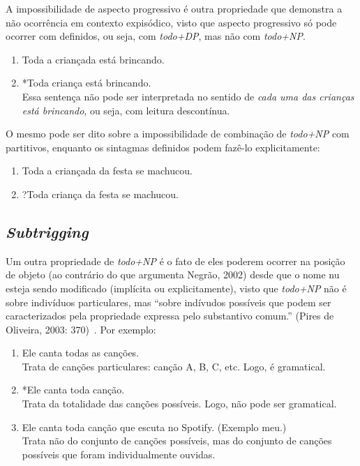A impossibilidade de aspecto progressivo é outra propriedade que demonstra a não ocorrência em contexto expisódico, visto que aspecto progressivo só pode ocorrer com definidos, ou seja, com \emph{todo+DP}, mas não com \emph{todo+NP}.

\begin{enumerate}[resume]
    \item Toda a criançada está brincando.
    \item *Toda criança está brincando. \\
    Essa sentença não pode ser interpretada no sentido de \emph{cada uma das crianças está brincando}, ou seja, com leitura descontínua.
\end{enumerate}

O mesmo pode ser dito sobre a impossibilidade de combinação de \emph{todo+NP} com partitivos, enquanto os sintagmas definidos podem fazê-lo explicitamente:

\begin{enumerate}[resume]
    \item Toda a criançada da festa se machucou.
    \item ?Toda criança da festa se machucou.
\end{enumerate}

\subsection{\emph{Subtrigging}}
Um outra propriedade de \emph{todo+NP} é o fato de eles poderem ocorrer na posição de objeto (ao contrário do que argumenta Negrão, 2002) desde que o nome nu esteja sendo modificado (implícita ou explicitamente), visto que \emph{todo+NP} não é sobre indivíduos particulares, mas ``sobre indívudos possíveis que podem ser caracterizados pela propriedade expressa pelo substantivo comum.'' (Pires de Oliveira, 2003: 370)~\cite{PiresOliv2003}. Por exemplo:

\begin{enumerate}[resume]
    \item Ele canta todas as canções. \\
    Trata de canções particulares: canção A, B, C, etc. Logo, é gramatical.
    \item *Ele canta toda canção. \\
    Trata da totalidade das canções possíveis. Logo, não pode ser gramatical.
    \item Ele canta toda canção que escuta no Spotify. (Exemplo meu.) \\
    Trata não do conjunto de canções possíveis, mas do conjunto de canções possíveis que foram individualmente ouvidas.
\end{enumerate}

